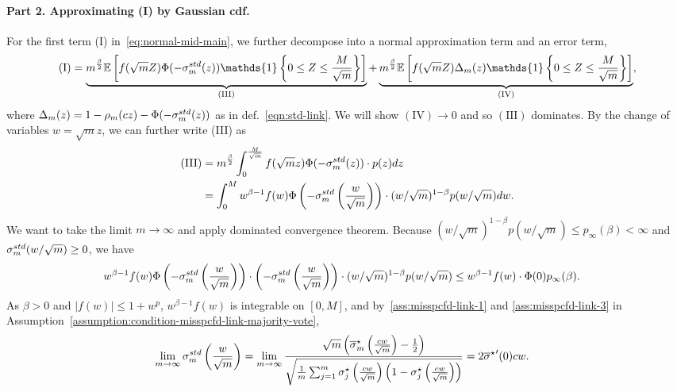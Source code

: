 \documentclass[11pt]{article}
\newcommand{\ind}{\mathds{1}}
\newcommand{\Ep}{\mathbb{E}}
\newcommand{\prn}[1]{\left({#1}\right)} %
\newcommand{\wb}[1]{\overline{#1}}
\newcommand{\<}{\langle} %
\renewcommand{\>}{\rangle}
\newcommand{\opt}{^\star}
\begin{document}
\paragraph{Part 2. Approximating (I) by Gaussian cdf.}
For the first term (I) in~\eqref{eq:normal-mid-main}, we further decompose into a normal approximation term and an error term,
\begin{align*}
  \mathrm{(I)} = \underbrace{m^{\frac{\beta}{2}}
    \Ep \left[f(\sqrt m Z)\Phi(-\linkstd(z))
      \ind\left\{0 \leq Z \leq \frac{M}{\sqrt m}\right\} \right]}_{\mathrm{(III)}} + \underbrace{m^{\frac{\beta}{2}} \Ep \left[f(\sqrt m Z)\Delta_m(z) \ind\left\{0 \leq Z \leq \frac{M}{\sqrt m}\right\} \right]}_{\mathrm{(IV)}}, %
\end{align*}
where $\Delta_m(z) = 1 - \rho_m(cz) - \Phi(-\linkstd(z))$ as in
def.~\eqref{eqn:std-link}. We will show $\mathrm{(IV)} \to 0$ and so
$\mathrm{(III)}$ dominates. By the change of variables $w = \sqrt{m}z$, we can
further write (III) as
\begin{align*}
  \mathrm{(III)} 
  & = m^{\frac{\beta}{2}} \int_0^{\frac{M}{\sqrt m}} f(\sqrt m z) \Phi
  ( -\linkstd(z)) \cdot p(z) d z \nonumber \\
  & = \int_0^{M} w^{\beta - 1} f(w) \Phi  \left( - \linkstd\prn{\frac{w}{\sqrt m}}\right) \cdot  (w/\sqrt{m})^{1-\beta} p(w/\sqrt{m}) d w   .
\end{align*}
We want to take the limit $m \to \infty$ and apply dominated convergence
theorem. Because $(w/\sqrt{m})^{1-\beta} p(w/\sqrt{m}) \leq p_\infty(\beta)
< \infty$ and $\linkstd(w/\sqrt m) \geq 0$, we have
\begin{align*}
	&  w^{\beta - 1} f(w) \Phi  \left( - \linkstd\prn{\frac{w}{\sqrt m}}\right) \cdot  \left( - \linkstd\prn{\frac{w}{\sqrt m}}\right) \cdot  (w/\sqrt{m})^{1-\beta} p(w/\sqrt{m}) \leq w^{\beta - 1} f(w) \cdot \Phi(0) p_\infty(\beta)   .
\end{align*} 
As $\beta > 0$ and $|f(w)| \leq 1 + w^p$, $w^{\beta - 1} f(w)$ is integrable
on $[0, M]$, and by~\eqref{ass:misspcfd-link-1} and \eqref{ass:misspcfd-link-3}
  in Assumption~\ref{assumption:condition-misspcfd-link-majority-vote},
\begin{align*}
	\lim_{m \to \infty} \linkstd\prn{\frac{w}{\sqrt m}} & = \lim_{m \to \infty}\frac{\sqrt{m}\left(\wb{\sigma}_m\opt\prn{\frac{cw}{\sqrt m}}-\frac{1}{2}\right)}{\sqrt{ \frac{1}{m} \sum_{j=1}^m \sigma_j\opt\prn{\frac{cw}{\sqrt m}}\prn{1 - \sigma_j\opt\prn{\frac{cw}{\sqrt m}}}}} =  2 {\wb{\sigma}\opt}'(0) cw   .
\end{align*}
\end{document}
